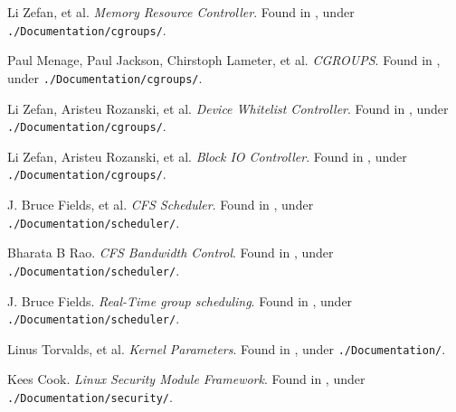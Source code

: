 \begin{thebibliography}{9}

Li Zefan, et al.  \emph{Memory Resource Controller}. Found in
\cite{linux-kernel-v3.14.2}, under \texttt{./Documentation/cgroups/}.


Paul Menage, Paul Jackson, Chirstoph Lameter, et al. \emph{CGROUPS}.  Found in
\cite{linux-kernel-v3.14.2}, under \texttt{./Documentation/cgroups/}.


Li Zefan, Aristeu Rozanski, et al. \emph{Device Whitelist Controller}.  Found
in \cite{linux-kernel-v3.14.2}, under \texttt{./Documentation/cgroups/}.


Li Zefan, Aristeu Rozanski, et al. \emph{Block IO Controller}.  Found
in \cite{linux-kernel-v3.14.2}, under \texttt{./Documentation/cgroups/}.



J. Bruce Fields, et al. \emph{CFS Scheduler}.  Found in
\cite{linux-kernel-v3.14.2}, under \texttt{./Documentation/scheduler/}.


Bharata B Rao. \emph{CFS Bandwidth Control}.  Found in
\cite{linux-kernel-v3.14.2}, under \texttt{./Documentation/scheduler/}.


J. Bruce Fields. \emph{Real-Time group scheduling}.  Found in
\cite{linux-kernel-v3.14.2}, under \texttt{./Documentation/scheduler/}.


Linus Torvalds, et al. \emph{Kernel Parameters}. Found in
\cite{linux-kernel-v3.14.2}, under \texttt{./Documentation/}.


Kees Cook. \emph{Linux Security Module Framework}. Found in
\cite{linux-kernel-v3.14.2}, under \texttt{./Documentation/security/}.

\end{thebibliography}
